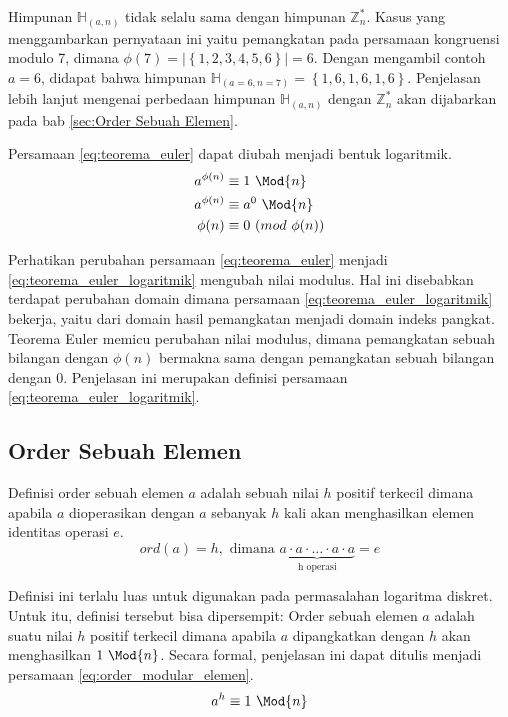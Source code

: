 Himpunan $ \mathbb{H}_{(a, n)} $ tidak selalu sama dengan himpunan $ \mathbb{Z}_n^{*} $. Kasus yang menggambarkan pernyataan ini yaitu pemangkatan pada persamaan kongruensi modulo 7, dimana $ \phi(7)=\left|\left\{1,2,3,4,5,6\right\}\right|\allowbreak=6 $. Dengan mengambil contoh $ a=6 $, didapat bahwa himpunan $ \mathbb{H}_{(a=6,n=7)}=\left\{1,6,1,6,1,6\right\} $. Penjelasan lebih lanjut mengenai perbedaan himpunan $ \mathbb{H}_{(a, n)} $ dengan $ \mathbb{Z}_n^{*} $ akan dijabarkan pada bab \ref{sec:Order Sebuah Elemen}.

Persamaan \eqref{eq:teorema_euler} dapat diubah menjadi bentuk logaritmik.
\begin{align}
a^{\phi(n)} &\equiv 1\ \Mod{n} \\
a^{\phi(n)} &\equiv a^0\ \Mod{n} \\
\phi(n) &\equiv 0\ (mod\ \phi(n))
\label{eq:teorema_euler_logaritmik}
\end{align}

Perhatikan perubahan persamaan \eqref{eq:teorema_euler} menjadi \eqref{eq:teorema_euler_logaritmik} mengubah nilai modulus. Hal ini disebabkan terdapat perubahan domain dimana persamaan \eqref{eq:teorema_euler_logaritmik} bekerja, yaitu dari domain hasil pemangkatan menjadi domain indeks pangkat. Teorema Euler memicu perubahan nilai modulus, dimana pemangkatan sebuah bilangan dengan $ \phi(n) $ bermakna sama dengan pemangkatan sebuah bilangan dengan $ 0 $. Penjelasan ini merupakan definisi persamaan \eqref{eq:teorema_euler_logaritmik}.

\subsection{Order Sebuah Elemen}

Definisi order sebuah elemen $ a $ adalah sebuah nilai $ h $ positif terkecil dimana apabila $ a $ dioperasikan dengan $ a $ sebanyak $ h $ kali akan menghasilkan elemen identitas operasi $ e $.\cite{harald_applied_number_theory}
\begin{equation}
ord(a)=h,\text{ dimana }\underbrace{a\cdot a\cdot\ldots\cdot a\cdot a}_{\text{h operasi}}=e
\label{eq:order_elemen}
\end{equation}

Definisi ini terlalu luas untuk digunakan pada permasalahan logaritma diskret. Untuk itu, definisi tersebut bisa dipersempit: Order sebuah elemen $ a $ adalah suatu nilai $ h $ positif terkecil dimana apabila $ a $ dipangkatkan dengan $ h $ akan menghasilkan $ 1\ \Mod{n} $. Secara formal, penjelasan ini dapat ditulis menjadi persamaan \eqref{eq:order_modular_elemen}.
\begin{equation}
a^h\equiv 1\ \Mod{n}
\label{eq:order_modular_elemen}
\end{equation}

